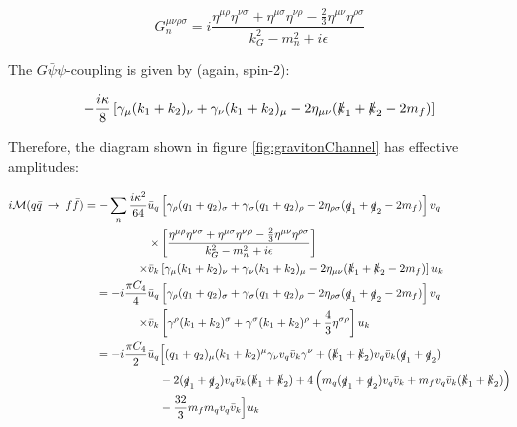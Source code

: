 \documentclass[11pt,a4paper]{article}
\begin{document}
\begin{equation}
	G_n^{\mu\nu\rho\sigma} = i\frac{\eta^{\mu\rho}\eta^{\nu\sigma} + \eta^{\mu\sigma}\eta^{\nu\rho} - \frac{2}{3}\eta^{\mu\nu}\eta^{\rho\sigma}}{k_G^2 - m_n^2 + i\epsilon}
\end{equation}

The $G\bar{\psi}\psi$-coupling is given by (again, spin-2):

\begin{equation}
	-\frac{i\kappa}{8}\left[\gamma_\mu(k_1 + k_2)_ \nu + \gamma_\nu(k_1+k_2)_\mu - 2\eta_{\mu\nu}(\slashed k_1 + \slashed k_2 - 2m_f)\right]
\end{equation}

Therefore, the diagram shown in figure \ref{fig:gravitonChannel} has effective amplitudes:

\begin{align}
	\begin{split}
	i\mathcal{M}(q\bar{q}\:\rightarrow\:f\bar{f}) = -\sum_{n}\frac{i\kappa^2}{64}\bar{u}_q&\left[\gamma_\rho(q_1 + q_2)_\sigma + \gamma_\sigma(q_1+q_2)_\rho - 2\eta_{\rho\sigma}(\slashed q_1 + \slashed q_2 - 2m_f)\right]v_q\\
	\times&\left[\frac{\eta^{\mu\rho}\eta^{\nu\sigma} + \eta^{\mu\sigma}\eta^{\nu\rho} - \frac{2}{3}\eta^{\mu\nu}\eta^{\rho\sigma}}{k_G^2 - m_n^2 + i\epsilon}\right]\\
	\times\bar{v}_k&\left[\gamma_\mu(k_1 + k_2)_\nu + \gamma_\nu(k_1+k_2)_\mu - 2\eta_{\mu\nu}(\slashed k_1 + \slashed k_2 - 2m_f)\right]u_k\\
	= -i\frac{\pi C_4}{4}\bar{u}_q&\left[\gamma_\rho(q_1 + q_2)_ \sigma + \gamma_\sigma(q_1+q_2)_\rho - 2\eta_{\rho\sigma}(\slashed q_1 + \slashed q_2 - 2m_f)\right]v_q\\
	\times\bar{v}_k&\left[\gamma^\rho(k_1 + k_2)^\sigma + \gamma^\sigma(k_1+k_2)^\rho + \frac{4}{3}\eta^{\sigma\rho}\right]u_k\\
	= -i\frac{\pi C_4}{2}\bar{u}_q&\Big[(q_1 + q_2)_ \mu(k_1+k_2)^\mu \gamma_\nu v_q\bar{v}_k\gamma^\nu + (\slashed k_1 + \slashed k_2)v_q\bar{v}_k(\slashed q_1 + \slashed q_2)\\
	&- 2(\slashed q_1 + \slashed q_2)v_q\bar{v}_k(\slashed k_1 + \slashed k_2) + 4\left(m_q(\slashed q_1 + \slashed q_2)v_q\bar{v}_k + m_fv_q\bar{v}_k(\slashed k_1 + \slashed k_2)\right)\\
	&- \frac{32}{3}m_fm_qv_q\bar{v}_k\Big]u_k
	\end{split}
\end{align}
\end{document}
